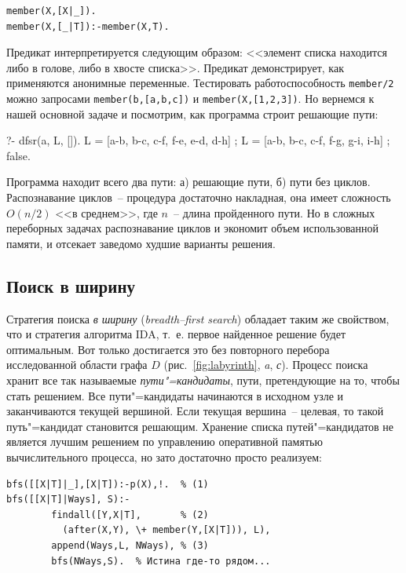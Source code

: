 \documentclass[a4paper,14pt, openany, twoside, final]{extbook} %
\newcommand{\eeng}[1]{\emph{\foreignlanguage{english}{#1}}}
\begin{document}
\begin{verbatim}
member(X,[X|_]).
member(X,[_|T]):-member(X,T).
\end{verbatim}


Предикат интерпретируется следующим образом: <<элемент списка находится либо в голове, либо в хвосте списка>>.  Предикат демонстрирует, как применяются анонимные переменные.  Тестировать работоспособность \texttt{member/2} можно запросами \texttt{member(b,[a,b,c])} и \texttt{member(X,[1,2,3])}.  Но вернемся к нашей основной задаче и посмотрим, как программа строит решающие пути:

\begin{proexp}
?- dfsr(a, L, []).
L = [a-b, b-c, c-f, f-e, e-d, d-h] ;
L = [a-b, b-c, c-f, f-g, g-i, i-h] ;
false.
\end{proexp}


Программа находит всего два пути: а) решающие пути, б) пути без циклов.  Распознавание циклов~-- процедура достаточно накладная, она имеет сложность $O(n/2)$ <<в среднем>>, где $n$~-- длина пройденного пути.  Но в сложных переборных задачах распознавание циклов и экономит объем использованной памяти, и отсекает заведомо худшие варианты решения.

\subsection{Поиск в ширину}
\label{sec:breadthfirst}

Стратегия поиска \emph{в ширину} (\eeng{breadth--first search}) обладает таким же свойством, что и стратегия алгоритма IDA, т.~е. первое найденное решение будет оптимальным.  Вот только достигается это без повторного перебора исследованной области графа $D$ (рис.~\ref{fig:labyrinth}, \emph{a}, \emph{с}).  Процесс поиска хранит все так называемые \emph{пути"=кандидаты}, пути, претендующие на то, чтобы стать решением.  Все пути"=кандидаты начинаются в исходном узле и заканчиваются текущей вершиной.  Если текущая вершина~-- целевая, то такой путь"=кандидат становится решающим.  Хранение списка путей"=кандидатов не является лучшим решением по управлению оперативной памятью вычислительного процесса, но зато достаточно просто реализуем:

\begin{verbatim}
bfs([[X|T]|_],[X|T]):-p(X),!.  % (1)
bfs([[X|T]|Ways], S):-
        findall([Y,X|T],       % (2)
          (after(X,Y), \+ member(Y,[X|T])), L),
        append(Ways,L, NWays), % (3)
        bfs(NWays,S).  % Истина где-то рядом...
\end{verbatim}
\end{document}
